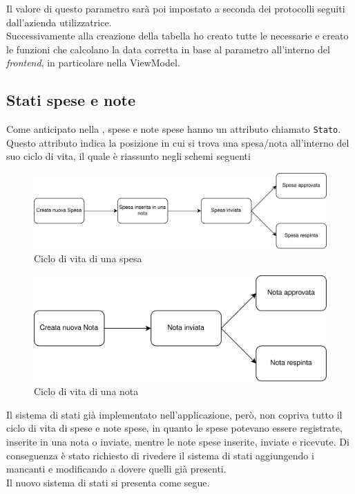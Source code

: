 \noindent Il valore di questo parametro sarà poi impostato a seconda dei protocolli seguiti dall'azienda utilizzatrice.\\
Successivamente alla creazione della tabella ho creato tutte le  necessarie e creato le funzioni che calcolano la data corretta in base al parametro all'interno del \textit{frontend}, in particolare nella ViewModel.

\subsection{Stati spese e note}
\label{cap:stati}

Come anticipato nella , spese e note spese hanno un attributo chiamato \texttt{Stato}. Questo attributo indica la posizione in cui si trova una spesa/nota all'interno del suo ciclo di vita, il quale è riassunto negli schemi seguenti

\begin{figure}[h!]
    \centering
    \includegraphics[width=\columnwidth]{images/SpesaLife.png}
    \caption{Ciclo di vita di una spesa}
\end{figure}

\begin{figure}[H]
    \centering
    \includegraphics[width=.8\columnwidth]{images/NotaLife.png}
    \caption{Ciclo di vita di una nota}
\end{figure}

\noindent Il sistema di stati già implementato nell'applicazione, però, non copriva tutto il ciclo di vita di spese e note spese, in quanto le spese potevano essere registrate, inserite in una nota o inviate, mentre le note spese inserite, inviate e ricevute. Di conseguenza è stato richiesto di rivedere il sistema di stati aggiungendo i mancanti e modificando a dovere quelli già presenti.\\
Il nuovo sistema di stati si presenta come segue.

